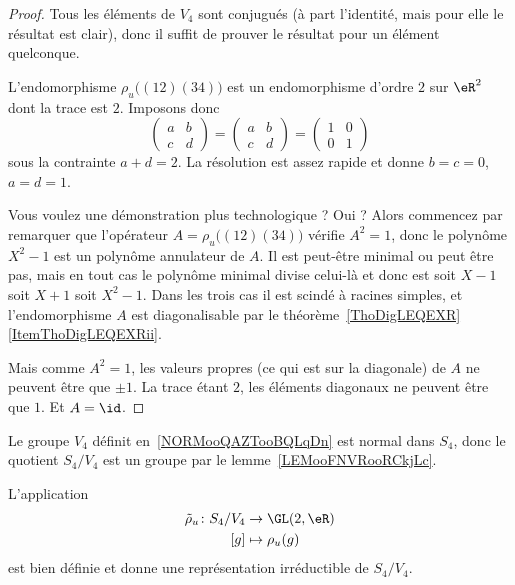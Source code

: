 \begin{proof}
    Tous les éléments de \( V_4\) sont conjugués (à part l'identité, mais pour elle le résultat est clair), donc il suffit de prouver le résultat pour un élément quelconque.

    L'endomorphisme \( \rho_u\big( (12)(34) \big)\) est un endomorphisme d'ordre \( 2\) sur \( \eR^2\) dont la trace est \( 2\). Imposons donc
    \begin{equation}
        \begin{pmatrix}
            a    &   b    \\
            c    &   d
        \end{pmatrix}=\begin{pmatrix}
            a    &   b    \\
            c    &   d
        \end{pmatrix}=\begin{pmatrix}
            1    &   0    \\
            0    &   1
        \end{pmatrix}
    \end{equation}
    sous la contrainte \( a+d=2\). La résolution est assez rapide et donne \( b=c=0\), \( a=d=1\).

    Vous voulez une démonstration plus technologique ? Oui ? Alors commencez par remarquer que l'opérateur \( A=\rho_u\big( (12)(34) \big)\) vérifie \( A^2=1\), donc le polynôme \( X^2-1\) est un polynôme annulateur de \( A\). Il est peut-être minimal ou peut être pas, mais en tout cas le polynôme minimal divise celui-là et donc est soit \( X-1\) soit \( X+1\) soit \( X^2-1\). Dans les trois cas il est scindé à racines simples, et l'endomorphisme \( A\) est diagonalisable par le théorème~\ref{ThoDigLEQEXR}\ref{ItemThoDigLEQEXRii}.

    Mais comme \( A^2=1\), les valeurs propres (ce qui est sur la diagonale) de \( A\) ne peuvent être que \( \pm1\). La trace étant \( 2\), les éléments diagonaux ne peuvent être que \( 1\). Et \( A=\id\).
\end{proof}


Le groupe \( V_4\) définit en~\ref{NORMooQAZTooBQLqDn} est normal dans \( S_4\), donc le quotient \( S_4/V_4\) est un groupe par le lemme~\ref{LEMooFNVRooRCkjLc}.

\begin{lemma}
    L'application
    \begin{equation}
        \begin{aligned}
            \tilde \rho_u\colon S_4/V_4&\to \GL(2,\eR) \\
            [g]&\mapsto \rho_u(g)
        \end{aligned}
    \end{equation}
    est bien définie et donne une représentation irréductible de \( S_4/V_4\).
\end{lemma}

